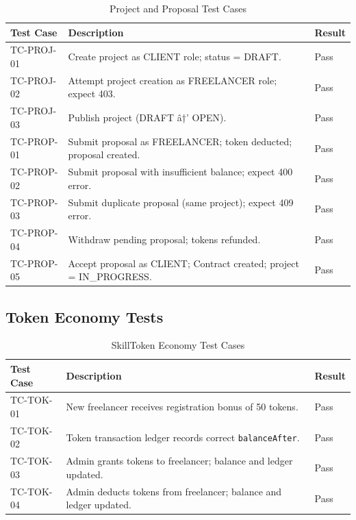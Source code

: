 \begin{table}[H]
\centering
\caption{Project and Proposal Test Cases}
\begin{tabularx}{\textwidth}{lXl}
\toprule
\textbf{Test Case} & \textbf{Description} & \textbf{Result} \\
\midrule
TC-PROJ-01 & Create project as CLIENT role; status = DRAFT.                       & Pass \\
TC-PROJ-02 & Attempt project creation as FREELANCER role; expect 403.             & Pass \\
TC-PROJ-03 & Publish project (DRAFT â†’ OPEN).                                      & Pass \\
TC-PROP-01 & Submit proposal as FREELANCER; token deducted; proposal created.     & Pass \\
TC-PROP-02 & Submit proposal with insufficient balance; expect 400 error.         & Pass \\
TC-PROP-03 & Submit duplicate proposal (same project); expect 409 error.          & Pass \\
TC-PROP-04 & Withdraw pending proposal; tokens refunded.                          & Pass \\
TC-PROP-05 & Accept proposal as CLIENT; Contract created; project = IN\_PROGRESS. & Pass \\
\bottomrule
\end{tabularx}
\end{table}

\subsection{Token Economy Tests}

\begin{table}[H]
\centering
\caption{SkillToken Economy Test Cases}
\begin{tabularx}{\textwidth}{lXl}
\toprule
\textbf{Test Case} & \textbf{Description} & \textbf{Result} \\
\midrule
TC-TOK-01 & New freelancer receives registration bonus of 50 tokens.            & Pass \\
TC-TOK-02 & Token transaction ledger records correct \texttt{balanceAfter}.     & Pass \\
TC-TOK-03 & Admin grants tokens to freelancer; balance and ledger updated.      & Pass \\
TC-TOK-04 & Admin deducts tokens from freelancer; balance and ledger updated.   & Pass \\
\bottomrule
\end{tabularx}
\end{table}

